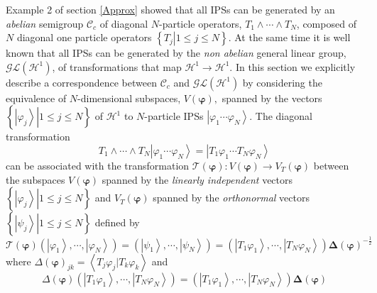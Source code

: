 \documentclass[aps,preprint]{revtex4}%
\begin{document}
Example 2 of section \ref{Approx} showed that all IPSs can be generated by an
\emph{abelian} semigroup $\mathcal{C}_{c}$ of diagonal $N$-particle operators,
$T_{1}\wedge\cdots\wedge T_{N}$, composed of $N$ diagonal one particle
operators $\left\{  \left.  T_{j}\right\vert 1\leq j\leq N\right\}  $. At the
same time it is well known that all IPSs can be generated by the \emph{non
abelian} general linear group, $\mathcal{GL}\left(  \mathcal{H}^{1}\right)  $,
of transformations that map $\mathcal{H}^{1}\rightarrow\mathcal{H}^{1}$. In
this section we explicitly describe a correspondence between $\mathcal{C}_{c}$
and $\mathcal{GL}\left(  \mathcal{H}^{1}\right)  $ by considering the
equivalence of $N$-dimensional subspaces, $V\left(  \mathbf{\varphi}\right)
,$ spanned by the vectors $\left\{  \left.  \left\vert \varphi_{j}%
\right\rangle \right\vert 1\leq j\leq N\right\}  $ of $\mathcal{H}^{1}$ to
$N$-particle IPSs $\left\vert \varphi_{1}\cdots\varphi_{N}\right\rangle $. The
diagonal transformation
\begin{equation}
T_{1}\wedge\cdots\wedge T_{N}\left\vert \varphi_{1}\cdots\varphi
_{N}\right\rangle =\left\vert T_{1}\varphi_{1}\cdots T_{N}\varphi
_{N}\right\rangle
\end{equation}
can be associated with the transformation $\mathcal{T}\left(  \mathbf{\varphi
}\right)  :V\left(  \mathbf{\varphi}\right)  \rightarrow V_{T}\left(
\mathbf{\varphi}\right)  $ between the subspaces $V\left(  \mathbf{\varphi
}\right)  $ spanned by the \emph{linearly independent }vectors $\left\{
\left.  \left\vert \varphi_{j}\right\rangle \right\vert 1\leq j\leq N\right\}
$ and $V_{T}\left(  \mathbf{\varphi}\right)  $ spanned by the
\emph{orthonormal} vectors $\left\{  \left.  \left\vert \psi_{j}\right\rangle
\right\vert 1\leq j\leq N\right\}  $ defined by%
\begin{equation}
\mathcal{T}\left(  \mathbf{\varphi}\right)  \left(  \left\vert \varphi
_{1}\right\rangle ,\cdots,\left\vert \varphi_{N}\right\rangle \right)
=\left(  \left\vert \psi_{1}\right\rangle ,\cdots,\left\vert \psi
_{N}\right\rangle \right)  =\left(  \left\vert T_{1}\varphi_{1}\right\rangle
,\cdots,\left\vert T_{N}\varphi_{N}\right\rangle \right)  \mathbf{\Delta
}\left(  \mathbf{\varphi}\right)  ^{-\frac{1}{2}}%
\end{equation}
where $\Delta\left(  \mathbf{\varphi}\right)  _{jk}=\left\langle T_{j}%
\varphi_{j}|T_{k}\varphi_{k}\right\rangle $ and
\begin{equation}
\Delta\left(  \mathbf{\varphi}\right)  \left(  \left\vert T_{1}\varphi
_{1}\right\rangle ,\cdots,\left\vert T_{N}\varphi_{N}\right\rangle \right)
=\left(  \left\vert T_{1}\varphi_{1}\right\rangle ,\cdots,\left\vert
T_{N}\varphi_{N}\right\rangle \right)  \mathbf{\Delta}\left(  \mathbf{\varphi
}\right)  \label{delta}%
\end{equation}
\end{document}
